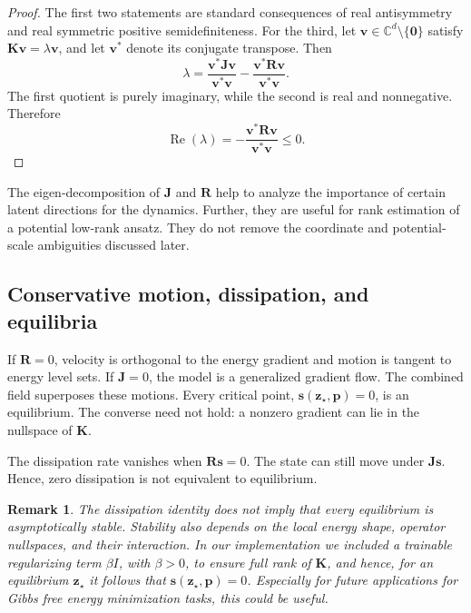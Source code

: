 \documentclass[a4paper,11pt]{article}
\newtheorem{remark}{Remark}
\newcommand{\z}{\bm z}
\newcommand{\p}{\bm p}
\newcommand{\s}{\bm s}
\newcommand{\Jop}{\bm J}
\newcommand{\Rop}{\bm R}
\newcommand{\Kop}{\bm K}
\begin{document}
\begin{proof}
The first two statements are standard consequences of real antisymmetry and
real symmetric positive semidefiniteness. For the third, let
$\bm v\in\mathbb C^d\setminus\{\bm0\}$ satisfy
$\Kop\bm v=\lambda\bm v$, and let $\bm v^\ast$ denote its conjugate transpose.
Then
\begin{equation}
  \lambda
  =\frac{\bm v^\ast\Jop\bm v}{\bm v^\ast\bm v}
   -\frac{\bm v^\ast\Rop\bm v}{\bm v^\ast\bm v}.
\end{equation}
The first quotient is purely imaginary, while the second is real and
nonnegative. Therefore
\begin{equation}
  \operatorname{Re}(\lambda)
  =-\frac{\bm v^\ast\Rop\bm v}{\bm v^\ast\bm v}
  \leq0.
\end{equation}
\end{proof}
The eigen-decomposition of $\Jop$ and $\Rop$ help to analyze the importance of certain latent directions for the dynamics. Further, they are useful for rank estimation of a potential low-rank ansatz. They do not remove the coordinate and potential-scale ambiguities discussed later. 

\subsection{Conservative motion, dissipation, and equilibria}
If $\Rop=0$, velocity is orthogonal to the energy gradient and motion is tangent to energy level sets. If $\Jop=0$, the model is a generalized gradient flow. The combined field superposes these motions. Every critical point, $\s(\z_\star,\p)=0$, is an equilibrium. The converse need not hold: a nonzero gradient can lie in the nullspace of $\Kop$.

The dissipation rate vanishes when $\Rop\s=0$. The state can still move under $\Jop\s$. Hence, zero dissipation is not equivalent to equilibrium.

\begin{remark}
    The dissipation identity does not imply that every equilibrium is asymptotically stable. Stability also depends on the local energy shape, operator nullspaces, and their interaction. In our implementation we included a trainable regularizing term $\beta I$, with $\beta > 0$, to ensure full rank of $\Kop$, and hence, for an equilibrium $\z_\star$ it follows that $\s(\z_\star,\p)=0$. Especially for future applications for Gibbs free energy minimization tasks, this could be useful.
\end{remark}
\end{document}
